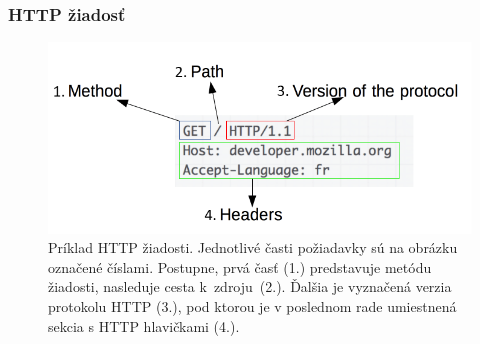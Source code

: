 \pagebreak

\subsubsection{HTTP žiadosť}

\begin{figure}[htb]
\begin{center}
    \includegraphics[scale=0.6]{obrazky-figures/http_request.png}
    \caption{\centering Príklad HTTP žiadosti. Jednotlivé časti požiadavky sú na obrázku označené číslami. Postupne, prvá časť (1.) predstavuje metódu žiadosti, nasleduje cesta \mbox{k zdroju (2.)}. Ďalšia je vyznačená verzia protokolu HTTP (3.), pod ktorou je v poslednom rade umiestnená sekcia s HTTP hlavičkami (4.).}
    \label{fig:http-request}
\end{center}
\end{figure}

